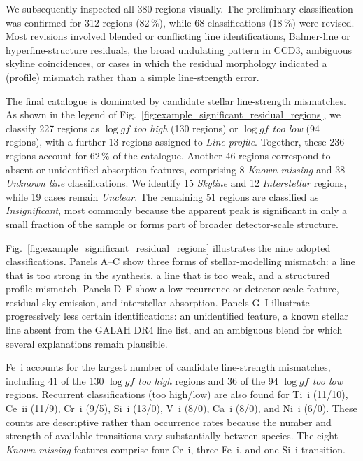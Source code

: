 \documentclass[twocolumn,apj,numberedappendix,appendixfloats]{openjournal}
\begin{document}
We subsequently inspected all 380 regions visually. The preliminary classification was confirmed for 312 regions ($82\,\mathrm{\%}$), while 68 classifications ($18\,\mathrm{\%}$) were revised. Most revisions involved blended or conflicting line identifications, Balmer-line or hyperfine-structure residuals, the broad undulating pattern in CCD3, ambiguous skyline coincidences, or cases in which the residual morphology indicated a (profile) mismatch rather than a simple line-strength error.

The final catalogue is dominated by candidate stellar line-strength mismatches. As shown in the legend of Fig.~\ref{fig:example_significant_residual_regions}, we classify 227 regions as \textit{$\log gf$ too high} (130 regions) or \textit{$\log gf$ too low} (94 regions), with a further 13 regions assigned to \textit{Line profile}. Together, these 236 regions account for $62\,\mathrm{\%}$ of the catalogue. Another 46 regions correspond to absent or unidentified absorption features, comprising 8 \textit{Known missing} and 38 \textit{Unknown line} classifications. We identify 15 \textit{Skyline} and 12 \textit{Interstellar} regions, while 19 cases remain \textit{Unclear}. The remaining 51 regions are classified as \textit{Insignificant}, most commonly because the apparent peak is significant in only a small fraction of the sample or forms part of broader detector-scale structure.

Fig.~\ref{fig:example_significant_residual_regions} illustrates the nine adopted classifications. Panels A--C show three forms of stellar-modelling mismatch: a line that is too strong in the synthesis, a line that is too weak, and a structured profile mismatch. Panels D--F show a low-recurrence or detector-scale feature, residual sky emission, and interstellar absorption. Panels G--I illustrate progressively less certain identifications: an unidentified feature, a known stellar line absent from the GALAH DR4 line list, and an ambiguous blend for which several explanations remain plausible.

Fe~{\sc i} accounts for the largest number of candidate line-strength mismatches, including 41 of the 130 \textit{$\log gf$ too high} regions and 36 of the 94 \textit{$\log gf$ too low} regions. Recurrent classifications (too high/low) are also found for Ti~{\sc i} (11/10), Ce~{\sc ii} (11/9), Cr~{\sc i} (9/5), Si~{\sc i} (13/0), V~{\sc i} (8/0), Ca~{\sc i} (8/0), and Ni~{\sc i} (6/0). These counts are descriptive rather than occurrence rates because the number and strength of available transitions vary substantially between species. The eight \textit{Known missing} features comprise four Cr~{\sc i}, three Fe~{\sc i}, and one Si~{\sc i} transition.
\end{document}
